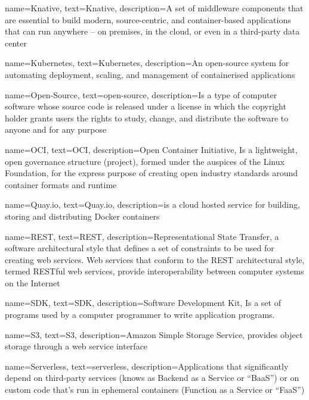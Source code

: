 {
    name={Knative},
    text={Knative},
    description={A set of middleware components that are essential to build modern, source-centric, and container-based applications that can run anywhere -- on premises, in the cloud, or even in a third-party data center}
}

{
    name={Kubernetes},
    text={Kubernetes},
    description={An open-source system for automating deployment, scaling, and management of containerised applications}
}

{
    name={Open-Source},
    text={open-source},
    description={Is a type of computer software whose source code is released under a license in which the copyright holder grants users the rights to study, change, and distribute the software to anyone and for any purpose}
}

{
    name={OCI},
    text={OCI},
    description={Open Container Initiative, Is a lightweight, open governance structure (project), formed under the auspices of the Linux Foundation, for the express purpose of creating open industry standards around container formats and runtime}
}

{
    name={Quay.io},
    text={Quay.io},
    description={is a cloud hosted service for building, storing and distributing Docker containers}
}

{
    name={REST},
    text={REST},
    description={Representational State Transfer, a software architectural style that defines a set of constraints to be used for creating web services. Web services that conform to the REST architectural style, termed RESTful web services, provide interoperability between computer systems on the Internet}
}

{
    name={SDK},
    text={SDK},
    description={Software Development Kit, Is a set of programs used by a computer programmer to write application programs.}
}

{
    name={S3},
    text={S3},
    description={Amazon Simple Storage Service, provides object storage through a web service interface}
}

{
    name={Serverless},
    text={serverless},
    description={Applications that significantly depend on third-party services (knows as Backend as a Service or “BaaS”) or on custom code that’s run in ephemeral containers (Function as a Service or “FaaS”)}
}

